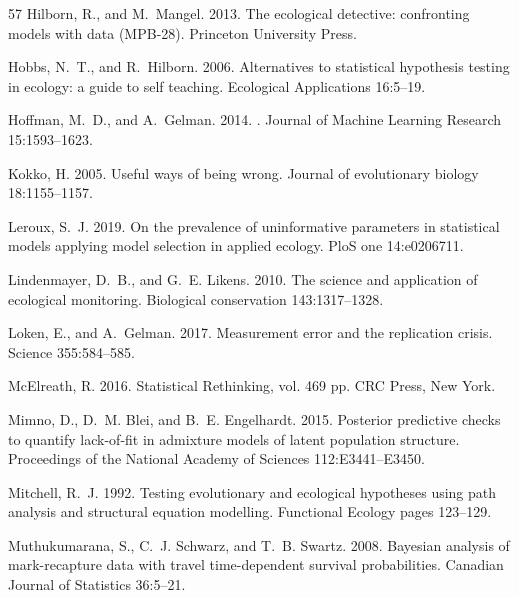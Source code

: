 \documentclass[11pt]{article}
\begin{document}
\begin{thebibliography}{57}
Hilborn, R., and M.~Mangel. 2013.
\newblock The ecological detective: confronting models with data (MPB-28).
\newblock Princeton University Press.

Hobbs, N.~T., and R.~Hilborn. 2006.
\newblock Alternatives to statistical hypothesis testing in ecology: a guide to
  self teaching.
\newblock Ecological Applications 16:5--19.

Hoffman, M.~D., and A.~Gelman. 2014.
.
\newblock Journal of Machine Learning Research 15:1593--1623.

Kokko, H. 2005.
\newblock Useful ways of being wrong.
\newblock Journal of evolutionary biology 18:1155--1157.

Leroux, S.~J. 2019.
\newblock On the prevalence of uninformative parameters in statistical models
  applying model selection in applied ecology.
\newblock PloS one 14:e0206711.

Lindenmayer, D.~B., and G.~E. Likens. 2010.
\newblock The science and application of ecological monitoring.
\newblock Biological conservation 143:1317--1328.

Loken, E., and A.~Gelman. 2017.
\newblock Measurement error and the replication crisis.
\newblock Science 355:584--585.

McElreath, R. 2016.
\newblock Statistical Rethinking, vol. 469 pp.
\newblock CRC Press, New York.

Mimno, D., D.~M. Blei, and B.~E. Engelhardt. 2015.
\newblock Posterior predictive checks to quantify lack-of-fit in admixture
  models of latent population structure.
\newblock Proceedings of the National Academy of Sciences 112:E3441--E3450.

Mitchell, R.~J. 1992.
\newblock Testing evolutionary and ecological hypotheses using path analysis
  and structural equation modelling.
\newblock Functional Ecology pages 123--129.

Muthukumarana, S., C.~J. Schwarz, and T.~B. Swartz. 2008.
\newblock Bayesian analysis of mark-recapture data with travel time-dependent
  survival probabilities.
\newblock Canadian Journal of Statistics 36:5--21.


\end{thebibliography}
\end{document}
